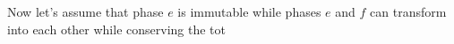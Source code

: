 Now let's assume that phase \(e\) is immutable while phases \(e\) and \(f\) can transform into each other while conserving the tot